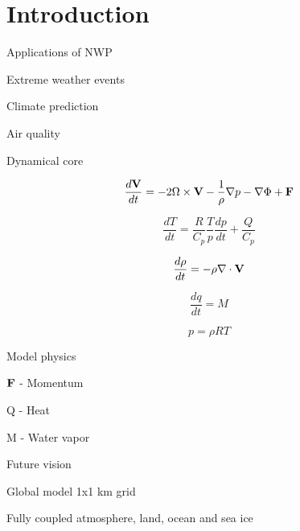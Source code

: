 \section{Introduction}

\begin{frame}{Applications of NWP}
  \begin{wideitemize}
    \item Extreme weather events
    \item Climate prediction
    \item Air quality
  \end{wideitemize}
\end{frame}


\begin{frame}{Dynamical core}

$$ \frac{d \mathbf{V}}{dt} = -2 \Omega \times \mathbf{V} - \frac{1}{\rho} \nabla p -\nabla \Phi + \mathbf{F} $$

$$ \frac{dT}{dt} = \frac{R}{C_p}\frac{T}{p}\frac{dp}{dt} + \frac{Q}{C_p} $$

$$ \frac{d \rho }{dt} = - \rho \nabla \cdot \mathbf{V} $$

$$ \frac{dq}{dt} = M $$

$$ p = \rho R T $$

\end{frame}



\begin{frame}{Model physics}

  \begin{wideitemize}
    \item $\mathbf{F}$ - Momentum
    \item Q - Heat
    \item M - Water vapor
  \end{wideitemize}

\end{frame}


\begin{frame}{Future vision}
  \begin{wideitemize}
    \item Global model 1x1 km grid
    \item Fully coupled atmosphere, land, ocean and sea ice
  \end{wideitemize}
\end{frame}


